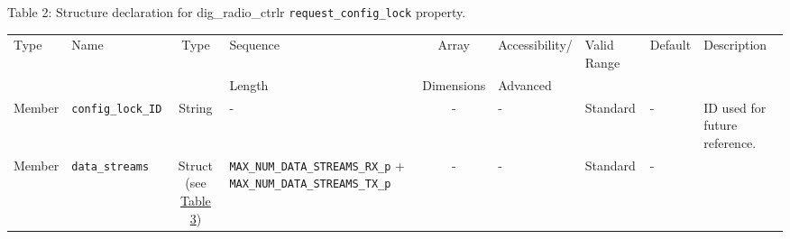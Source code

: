 \documentclass{article}
\def\comp{dig\_radio\_ctrlr}
\begin{document}
\begin{landscape}
\begin{scriptsize}
\begin{longtable}{|p{5.3cm}|c|p{3.5cm}|p{3.5cm}|c|c|p{4.4cm}|}
		\end{longtable}
	\end{scriptsize}

\pagebreak
	\noindent Table \hypertarget{tab2}{2}: Structure declaration for \comp{} \verb+request_config_lock+ property.
	\begin{scriptsize}
		\noindent\begin{longtable}{|p{1.8cm}|p{3.6cm}|c|p{4cm}|c|p{2cm}|p{1.7cm}|p{0.8cm}|p{3.10cm}|}
			\hline
			\rowcolor{blue}
			Type         & Name                                & Type & Sequence & Array      & Accessibility/ & Valid Range  & Default & Description                                                                                                                                                                                                                       \\
			\rowcolor{blue}
			             &                                     &      & Length   & Dimensions & Advanced       &              &         &                                                                                                                                                                                                                             \\
			\hline
			Member       & \verb+config_lock_ID+               & String& -       & -          & -              & Standard     & -       & ID used for future reference. \\
			\hline
			Member       & \verb+data_streams+                 & Struct (see \hyperlink{tab3}{Table 3}) & \verb+MAX_NUM_DATA_STREAMS_RX_p+ + \verb+MAX_NUM_DATA_STREAMS_TX_p+ & - & - & Standard & - & \\
			\hline
		\end{longtable}
	\end{scriptsize}


\end{landscape}
\end{document}
